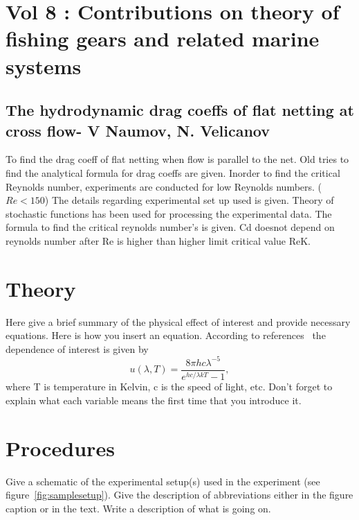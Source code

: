 \documentclass[letterpaper,12pt]{article}
\begin{document}
\section{Vol 8 : Contributions on theory of fishing gears and related marine systems}
\subsection{The hydrodynamic drag coeffs of flat netting at cross flow- V Naumov, N. Velicanov}
To find the drag coeff of flat netting when flow is parallel to the net. Old tries to find the analytical formula for drag coeffs are given. Inorder to find the critical Reynolds number, experiments are conducted for low Reynolds numbers. ($Re < 150$) The details regarding experimental set up used is given.
Theory of stochastic functions has been used for processing the experimental data. The formula to find the critical reynolds number's is given. Cd doesnot depend on reynolds number after Re is higher than higher limit critical value ReK. 






\section{Theory}

Here give a brief summary of the physical effect of interest and provide
necessary equations. Here is how you insert an equation. According to
references~\cite{melissinos, Cyr, Wiki} the dependence of interest is given
by
\begin{equation} \label{eq:aperp} %
u(\lambda,T)=\frac{8\pi hc\lambda^{-5}}{e^{hc/\lambda kT}-1},
\end{equation}
where T is temperature in Kelvin, c is the speed of light, etc. Don't forget to
explain what each variable means the first time that you introduce it.


\section{Procedures}

Give a schematic of the experimental setup(s) used in the experiment (see
figure~\ref{fig:samplesetup}). Give the description of  abbreviations
either in the figure caption or in the text. Write a description of what is
going on. 
\end{document}
